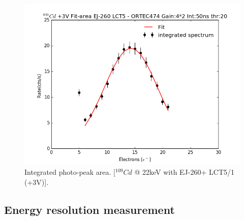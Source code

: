 \documentclass[10pt,a4paper, openany]{book}
\begin{document}
\begin{figure}[!h]
\begin{center}
\includegraphics[scale=0.4]{imm/area.png}
\end{center}
\caption{Integrated photo-peak area. [$^{109}Cd$ @ 22keV with EJ-260+ LCT5/1 (+3V)].} 
\label{fig:peak}
\end{figure}


\subsection{Energy resolution measurement}
\end{document}
